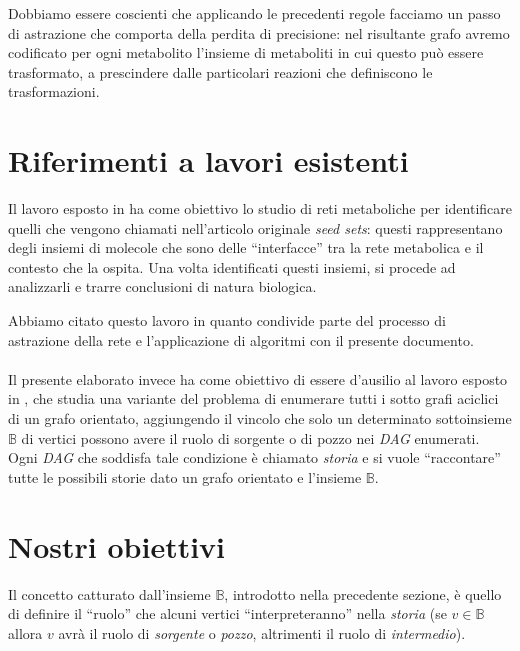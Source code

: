 Dobbiamo essere coscienti che applicando le precedenti regole facciamo
un passo di astrazione che comporta della perdita di precisione: nel
risultante grafo avremo codificato per ogni metabolito l'insieme di
metaboliti in cui questo pu\`o essere trasformato, a prescindere dalle
particolari reazioni che definiscono le trasformazioni.

\section{Riferimenti a lavori esistenti}
Il lavoro esposto in \cite{large-scale-reconstruction} ha come
obiettivo lo studio di reti metaboliche per identificare quelli che
vengono chiamati nell'articolo originale \emph{seed sets}: questi
rappresentano degli insiemi di molecole che sono delle ``interfacce''
tra la rete metabolica e il contesto che la ospita. Una volta
identificati questi insiemi, si procede ad analizzarli e trarre
conclusioni di natura biologica.

Abbiamo citato questo lavoro in quanto condivide parte del processo di
astrazione della rete e l'applicazione di algoritmi con il presente
documento.
\\\\
Il presente elaborato invece ha come obiettivo di essere d'ausilio al
lavoro esposto in \cite{tellingStories}, che studia una variante del
problema di enumerare tutti i sotto grafi aciclici di un grafo
orientato, aggiungendo il vincolo che solo un determinato sottoinsieme
$\mathbb{B}$ di vertici possono avere il ruolo di sorgente o di pozzo
nei \emph{DAG} enumerati. Ogni \emph{DAG} che soddisfa tale condizione
\`e chiamato \emph{storia} e si vuole ``raccontare'' tutte le
possibili storie dato un grafo orientato e l'insieme $\mathbb{B}$.

\section{Nostri obiettivi}
Il concetto catturato dall'insieme $\mathbb{B}$, introdotto nella
precedente sezione, \`e quello di definire il ``ruolo'' che alcuni
vertici ``interpreteranno'' nella \emph{storia} (se $v \in \mathbb{B}$
allora $v$ avr\`a il ruolo di \emph{sorgente} o \emph{pozzo},
altrimenti il ruolo di \emph{intermedio}).

